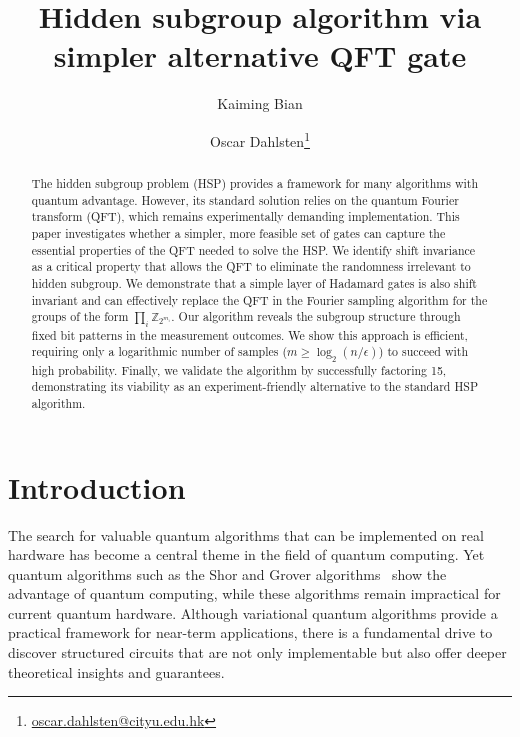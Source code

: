 \documentclass[aps,reprint,showpacs,tightenlines, twocolumn]{revtex4-2}
\newcommand{\ZZ}{\mathbb{Z}}
\begin{document}
\title{Hidden subgroup algorithm via simpler alternative QFT gate}

\author{Kaiming Bian}

\author{Oscar Dahlsten\thanks{\href{mailto:oscar.dahlsten@cityu.edu.hk}{oscar.dahlsten@cityu.edu.hk}}}

\begin{abstract}
    The hidden subgroup problem (HSP) provides a framework for many algorithms with quantum advantage. However, its standard solution relies on the quantum Fourier transform (QFT), which remains experimentally demanding implementation. This paper investigates whether a simpler, more feasible set of gates can capture the essential properties of the QFT needed to solve the HSP. We identify shift invariance as a critical property that allows the QFT to eliminate the randomness irrelevant to hidden subgroup. We demonstrate that a simple layer of Hadamard gates is also shift invariant and can effectively replace the QFT in the Fourier sampling algorithm for the groups of the form $\prod_i \ZZ_{2^{m_i}}$. Our algorithm reveals the subgroup structure through fixed bit patterns in the measurement outcomes. We show this approach is efficient, requiring only a logarithmic number of samples ($m \ge \log_2(n / \epsilon)$) to succeed with high probability. Finally, we validate the algorithm by successfully factoring 15, demonstrating its viability as an experiment-friendly alternative to the standard HSP algorithm.

\end{abstract}
\maketitle

\section{Introduction}

The search for valuable quantum algorithms that can be implemented on real hardware has become a central theme in the field of quantum computing. Yet quantum algorithms such as the Shor and Grover algorithms~\cite{shor1999polynomial, grover1996fast, nielsen2010quantum} show the advantage of quantum computing, while these algorithms remain impractical for current quantum hardware. Although variational quantum algorithms provide a practical framework for near-term applications, there is a fundamental drive to discover structured circuits that are not only implementable but also offer deeper theoretical insights and guarantees.
\end{document}
